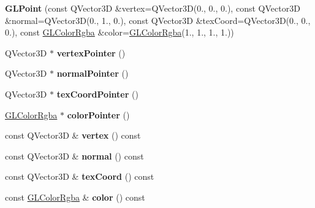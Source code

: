 \begin{DoxyCompactItemize}
\item 
\mbox{\label{class_g_l_point_a41a36ef6e07c906a279c866e86f2f241}} 
{\bfseries G\+L\+Point} (const Q\+Vector3D \&vertex=Q\+Vector3D(0., 0., 0.), const Q\+Vector3D \&normal=Q\+Vector3D(0., 1., 0.), const Q\+Vector3D \&tex\+Coord=Q\+Vector3D(0., 0., 0.), const \mbox{\hyperlink{class_g_l_color_rgba}{G\+L\+Color\+Rgba}} \&color=\mbox{\hyperlink{class_g_l_color_rgba}{G\+L\+Color\+Rgba}}(1., 1., 1., 1.))
\item 
\mbox{\label{class_g_l_point_a5582523837a5fbae6aeaf7c360553c0b}} 
Q\+Vector3D $\ast$ {\bfseries vertex\+Pointer} ()
\item 
\mbox{\label{class_g_l_point_a453d3148640b4a6a5bb8596370f236f8}} 
Q\+Vector3D $\ast$ {\bfseries normal\+Pointer} ()
\item 
\mbox{\label{class_g_l_point_ad4cffce86ff32bfbdbbbe6b884f354c6}} 
Q\+Vector3D $\ast$ {\bfseries tex\+Coord\+Pointer} ()
\item 
\mbox{\label{class_g_l_point_a86adf137055461d018700894c4c5f377}} 
\mbox{\hyperlink{class_g_l_color_rgba}{G\+L\+Color\+Rgba}} $\ast$ {\bfseries color\+Pointer} ()
\item 
\mbox{\label{class_g_l_point_a4766a3f463b4e46cd3af53a6d17cdd69}} 
const Q\+Vector3D \& {\bfseries vertex} () const
\item 
\mbox{\label{class_g_l_point_a4506f53f6b5312d3ec37cdbf566d57c8}} 
const Q\+Vector3D \& {\bfseries normal} () const
\item 
\mbox{\label{class_g_l_point_ac496dbef3a6ee7adc444b4e0c5d99ba0}} 
const Q\+Vector3D \& {\bfseries tex\+Coord} () const
\item 
\mbox{\label{class_g_l_point_a7f360810a20e379f02c1f2a00f56cc3e}} 
const \mbox{\hyperlink{class_g_l_color_rgba}{G\+L\+Color\+Rgba}} \& {\bfseries color} () const
\item 
\mbox{\label{class_g_l_point_adf9e0baf9c965a9642f34672e6564e9a}} 

\end{DoxyCompactItemize}
